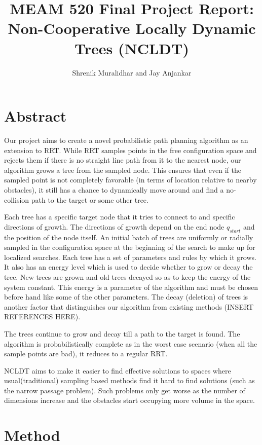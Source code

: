 \documentclass[fleqn]{article}
\title{MEAM 520 Final Project Report: Non-Cooperative Locally Dynamic Trees (NCLDT)}
\author{Shrenik Muralidhar and Jay Anjankar}
\begin{document}
	\maketitle
	
	\section{Abstract}
	
	Our project aims to create a novel probabilistic path planning algorithm as an extension to RRT. While RRT samples points in the free configuration space and rejects them if there is no straight line path from it to the nearest node, our algorithm grows a tree from the sampled node. This ensures that even if the sampled point is not completely favorable (in terms of location relative to nearby obstacles), it still has a chance to dynamically move around and find a no-collision path to the target or some other tree.
	
	Each tree has a specific target node that it tries to connect to and specific directions of growth. The directions of growth depend on the end node $q_{start}$ and the position of the node itself. An initial batch of trees are uniformly or radially sampled in the configuration space at the beginning of the search to make up for localized searches. Each tree has a set of parameters and rules by which it grows. It also has an energy level which is used to decide whether to grow or decay the tree. New trees are grown and old trees decayed so as to keep the energy of the system constant. This energy is a parameter of the algorithm and must be chosen before hand like some of the other parameters. The decay (deletion) of trees is another factor that distinguishes our algorithm from existing methods (INSERT REFERENCES HERE).
	
	The trees continue to grow and decay till a path to the target is found. The algorithm is probabilistically complete as in the worst case scenario (when all the sample points are bad), it reduces to a regular RRT.
	
	NCLDT aims to make it easier to find effective solutions to spaces where usual(traditional) sampling based methods find it hard to find solutions (such as the narrow passage problem). Such problems only get worse as the number of dimensions increase and the obstacles start occupying more volume in the space.
	
	\section{Method}
	
\end{document}
